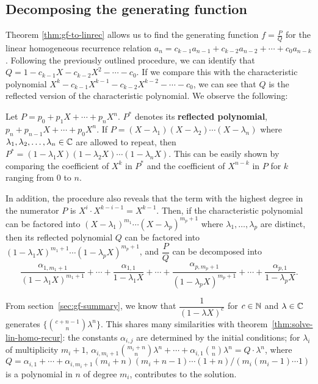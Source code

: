 \documentclass[a4paper, 12pt]{report}
\begin{document}
\subsection{Decomposing the generating function}
Theorem \ref{thm:gf-to-linrec} allows us to find the generating function $f = \frac{P}{Q}$ for the linear homogeneous recurrence relation $a_n = c_{k - 1} a_{n - 1} + c_{k - 2} a_{n - 2} + \cdots + c_0 a_{n - k}$. Following the previously outlined procedure, we can identify that $Q = 1 - c_{k - 1} X - c_{k - 2} X^2 - \cdots - c_{0}$. If we compare this with the characteristic polynomial $X^k - c_{k - 1} X^{k - 1} - c_{k - 2} X^{k - 2} - \cdots - c_{0}$, we can see that $Q$ is the reflected version of the characteristic polynomial. We observe the following:

\begin{rem}\label{lem:roots-reflected-poly}
Let $P = p_0 + p_1 X + \cdots + p_n X^n$. $P^*$ denotes its \textbf{reflected polynomial}, $p_n + p_{n - 1} X + \cdots + p_0 X^n$. If $P = (X - \lambda_1) (X - \lambda_2) \cdots (X - \lambda_n)$ where $\lambda_1, \lambda_2, \dots, \lambda_n \in \mathbb{C}$ are allowed to repeat, then $P^* = (1 - \lambda_1 X)(1 - \lambda_2 X)\cdots(1 - \lambda_n X)$. This can be easily shown by comparing the coefficient of $X^k$ in $P^*$ and the coefficient of $X^{n - k}$ in $P$ for $k$ ranging from $0$ to $n$. 
\end{rem}

In addition, the procedure also reveals that the term with the highest degree in the numerator $P$ is $X^i \cdot X^{k - i - 1} = X^{k - 1}$. Then, if the characteristic polynomial can be factored into $(X - \lambda_1)^{m_1} \cdots (X - \lambda_p)^{m_p + 1}$ where $\lambda_1, \dots, \lambda_p$ are distinct, then its reflected polynomial $Q$ can be factored into $(1 - \lambda_1 X)^{m_1 + 1} \cdots (1 - \lambda_p X)^{m_p + 1}$, and $\dfrac{P}{Q}$ can be decomposed into
\[\frac{\alpha_{1, m_1 + 1}}{(1 - \lambda_1 X)^{m_1 + 1}} + \cdots + \frac{\alpha_{1, 1}}{1 - \lambda_1 X} + \cdots + \frac{\alpha_{p, m_p + 1}}{(1 - \lambda_p X)^{m_p + 1}} + \cdots + \frac{\alpha_{p, 1}}{1 - \lambda_p X}.\]

From section~\ref{sec:gf-summary}, we know that $\dfrac{1}{(1 - \lambda X)^c}$ for $c \in \mathbb{N}$ and $\lambda \in \mathbb{C}$ generates $\{\binom{c + n - 1}{n} \lambda^n\}$. This shares many similarities with theorem~\ref{thm:solve-lin-homo-recur}: the constants $\alpha_{i, j}$ are determined by the initial conditions; for $\lambda_i$ of multiplicity $m_i + 1$, $\alpha_{i, m_i + 1} \binom{m_i + n}{n} \lambda^n + \cdots + \alpha_{i, 1} \binom{n}{n} \lambda^n = Q \cdot \lambda^n$, where $Q = \alpha_{i, 1} + \cdots + \alpha_{i, m_i + 1}(m_i + n)(m_i + n - 1)\cdots(1 + n)/(m_i(m_i - 1)\cdots1)$ is a polynomial in $n$ of degree $m_i$, contributes to the solution.
\end{document}
